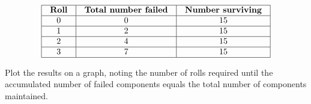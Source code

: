 $$\vbox{\offinterlineskip
\halign{\strut
\vrule \quad\hfil # \ \hfil & 
\vrule \quad\hfil # \ \hfil & 
\vrule \quad\hfil # \ \hfil \vrule \cr
\noalign{\hrule}
%
{\bf Roll} & {\bf Total number failed} & {\bf Number surviving} \cr
%
\noalign{\hrule}
%
0 & 0 & 15 \cr
%
\noalign{\hrule}
%
1 & 2 & 15 \cr
%
\noalign{\hrule}
%
2 & 4 & 15 \cr
%
\noalign{\hrule}
%
3 & 7 & 15 \cr
%
\noalign{\hrule}
} %
}$$ %

Plot the results on a graph, noting the number of rolls required until the accumulated number of failed components equals the total number of components maintained.


















